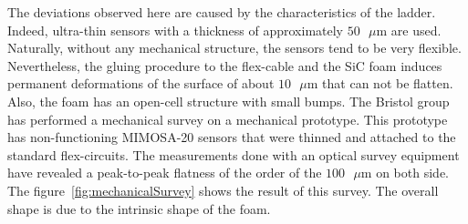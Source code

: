       The deviations observed here are caused by the characteristics of the ladder.
      Indeed, ultra-thin sensors with a thickness of approximately $50 \text{ }\mu\text{m}$ are used.
      Naturally, without any mechanical structure, the sensors tend to be very flexible.
      Nevertheless, the gluing procedure to the flex-cable and the \gls{SiC} foam induces permanent deformations of the surface of about $10 \text{ }\mu\text{m}$ that can not be flatten.
      Also, the foam has an open-cell structure with small bumps.
      The Bristol group has performed a mechanical survey on a mechanical prototype.
      This prototype has non-functioning MIMOSA-20 sensors that were thinned and attached to the standard flex-circuits.
      The measurements done with an optical survey equipment have revealed a peak-to-peak flatness of the order of the $100 \text{ }\mu\text{m}$ on both side.
      The figure~\ref{fig:mechanicalSurvey} shows the result of this survey.
      The overall shape is due to the intrinsic shape of the foam.
       
